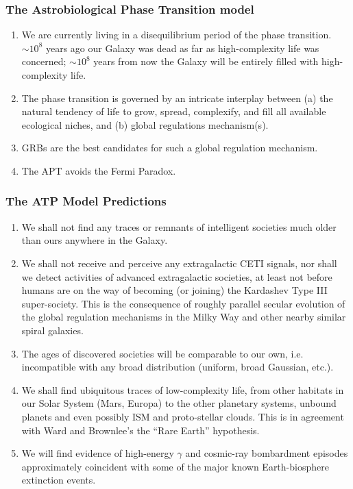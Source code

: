 \begin{frame}
\frametitle{ The Astrobiological Phase Transition  model }

\begin{enumerate}

\item  We are currently living in a disequilibrium period of the phase
transition. $\sim 10^8$ years ago our Galaxy was dead as far as high-complexity life was
concerned; $\sim 10^8$ years from now the Galaxy will be entirely filled with high-complexity life.
\item The phase transition is governed by an intricate interplay between (a) the natural
tendency of life to grow, spread, complexify, and fill all available ecological niches,
and (b) global regulations mechanism(s).
\item GRBs are the best candidates for such a global regulation mechanism.
\item The APT avoids the Fermi Paradox.
\end{enumerate}

\end{frame}

\begin{frame}
\frametitle{ The ATP Model Predictions }

\begin{enumerate}

\item  We shall not find any traces or remnants of intelligent societies much older than ours
anywhere in the Galaxy.
\item We shall not receive and perceive any extragalactic CETI signals, nor shall we detect
activities of advanced extragalactic societies, at least not before humans are on the way
of becoming (or joining) the Kardashev Type III super-society. This is the consequence
of roughly parallel secular evolution of the global regulation mechanisms in the Milky
Way and other nearby similar spiral galaxies.
\item The ages of discovered societies will be comparable to our own, i.e. incompatible with
any broad distribution (uniform, broad Gaussian, etc.).
\item We shall find ubiquitous traces of low-complexity life, from other habitats in our Solar
System (Mars, Europa) to the other planetary systems, unbound planets and even possibly
ISM and proto-stellar clouds. This is in agreement with Ward and Brownlee’s the “Rare
Earth” hypothesis. 
\item We will find 
evidence of high-energy $\gamma$ and cosmic-ray bombardment episodes approximately
coincident with some of the major known Earth-biosphere extinction events.
\end{enumerate}

\end{frame}

